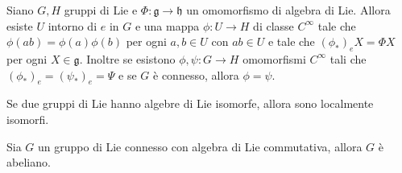 \begin{theorem}
	Siano $G,H$ gruppi di Lie e $\Phi: \mathfrak g \to \mathfrak h$ un omomorfismo di algebra di Lie. Allora esiste $U$ intorno di $e$ in $G$ e una mappa $\phi: U \to H$ di classe $C^\infty$ tale che $\phi(ab) = \phi(a) \phi(b)$ per ogni $a,b \in U$ con $ab \in U$ e tale che $(\phi_*)_e X = \Phi X$ per ogni $X\in\mathfrak g$.
	Inoltre se esistono $\phi,\psi : G \to H$ omomorfismi $C^\infty$ tali che $(\phi_*)_e = (\psi_*)_e = \Psi$ e se $G$ è connesso, allora $\phi = \psi$.
\end{theorem}


\begin{corollary}
	Se due gruppi di Lie hanno algebre di Lie isomorfe, allora sono localmente isomorfi.
\end{corollary}

\begin{corollary}
	Sia $G$ un gruppo di Lie connesso con algebra di Lie commutativa, allora $G$ è abeliano.
\end{corollary}









































